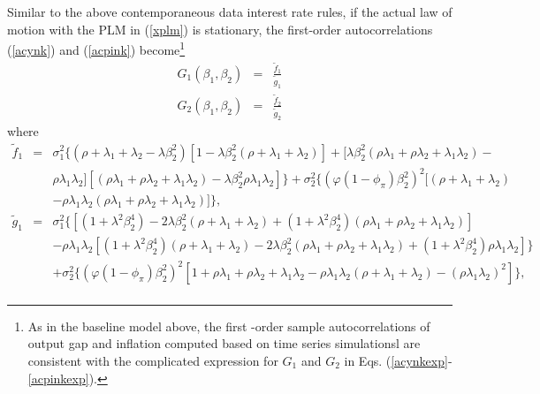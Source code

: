 Similar to the above contemporaneous data interest rate rules, if the actual law of motion with the PLM in (\ref{xplm}) is stationary, the first-order autocorrelations (\ref{acynk}) and (\ref{acpink}) become\footnote{As in the baseline model above, the first -order sample autocorrelations of output gap and inflation computed based on time series simulationsl are consistent with the complicated expression for $G_{1}$ and $G_{2}$ in Eqs. (\ref{acynkexp}-\ref{acpinkexp}).}
\begin{eqnarray}
G_{1}(\beta_1,\beta_2) &=&\frac{\widetilde{f}_1}{\widetilde{g}_1}\label{acynkexp}\\
G_{2}(\beta_1,\beta_2)
&=&\frac{\widetilde{f}_2}{\widetilde{g}_2}\label{acpinkexp}
\end{eqnarray}
where
\begin{eqnarray*}
\widetilde{f}_1&=&\sigma_1^2\Big\{(\rho+\lambda_1+\lambda_2-\lambda\beta_2^2)[1-\lambda\beta_2^2(\rho+\lambda_1+\lambda_2)]+[\lambda\beta_2^2(\rho\lambda_1+\rho\lambda_2+\lambda_1\lambda_2)-\\
&&\rho\lambda_1\lambda_2][(\rho\lambda_1+\rho\lambda_2+\lambda_1\lambda_2)-\lambda\beta_2^2\rho\lambda_1\lambda_2]\Big\}+\sigma_2^2\Big\{(\varphi(1-\phi_\pi)\beta_2^2)^2[(\rho+\lambda_1+\lambda_2)\\
&&-\rho\lambda_1\lambda_2(\rho\lambda_1+\rho\lambda_2+\lambda_1\lambda_2)]\Big\},\\
\widetilde{g}_1&=&\sigma_1^2\Big\{[(1+\lambda^2\beta_2^4)-2\lambda\beta_2^2(\rho+\lambda_1+\lambda_2)+(1+\lambda^2\beta_2^4)(\rho\lambda_1+\rho\lambda_2+\lambda_1\lambda_2)]\\
&&-\rho\lambda_1\lambda_2[(1+\lambda^2\beta_2^4)(\rho+\lambda_1+\lambda_2)-2\lambda\beta_2^2(\rho\lambda_1+\rho\lambda_2+\lambda_1\lambda_2)+(1+\lambda^2\beta_2^4)\rho\lambda_1\lambda_2]\Big\}\\
&&+\sigma_2^2\Big\{(\varphi(1-\phi_\pi)\beta_2^2)^2[1+\rho\lambda_1+\rho\lambda_2+\lambda_1\lambda_2-\rho\lambda_1\lambda_2(\rho+\lambda_1+\lambda_2)-(\rho\lambda_1\lambda_2)^2]\Big\},\\
\end{eqnarray*}
